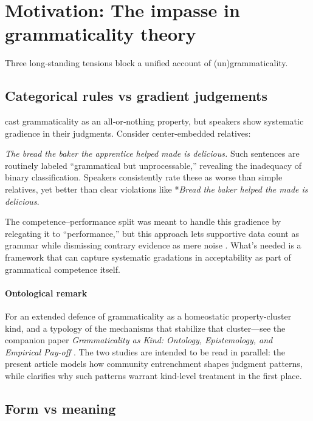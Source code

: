 \documentclass[12pt]{article}
\begin{document}
\section{Motivation: The impasse in grammaticality theory}

Three long‑standing tensions block a unified account of (un)grammaticality.

\subsection{Categorical rules vs gradient judgements}

\textcite{chomsky1957} cast grammaticality as an all‑or‑nothing property, but speakers show systematic gradience in their judgments. Consider center-embedded relatives:

\ea
\textit{The bread the baker the apprentice helped made is delicious.}
\z
Such sentences are routinely labeled \enquote{grammatical but unprocessable,} revealing the inadequacy of binary classification. Speakers consistently rate these as worse than simple relatives, yet better than clear violations like *\textit{Bread the baker helped the made is delicious}. 

The competence–performance split was meant to handle this gradience by relegating it to \enquote{performance,} but this approach lets supportive data count as grammar while dismissing contrary evidence as mere noise \parencite[71]{schutze2016}. What's needed is a framework that can capture systematic gradations in acceptability as part of grammatical competence itself.

\paragraph{Ontological remark}
For an extended defence of grammaticality as a homeostatic property-cluster kind, and a typology of the mechanisms that stabilize that cluster—see the companion paper \textit{Grammaticality as Kind: Ontology, Epistemology, and Empirical Pay-off} \parencite{ReynoldsKind_inprep}.  The two studies are intended to be read in parallel: the present article models how community entrenchment shapes judgment patterns, while \textcite{ReynoldsKind_inprep} clarifies why such patterns warrant kind-level treatment in the first place.

\subsection{Form vs meaning}
\end{document}
